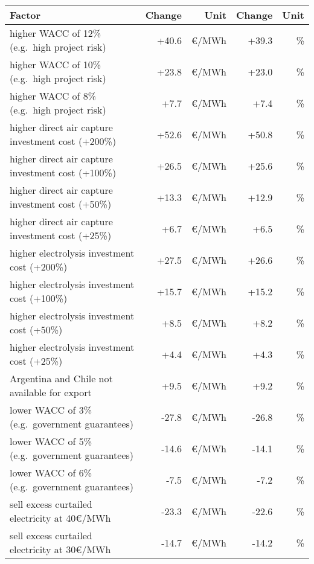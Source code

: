 \begin{table*}
    \small
    \centering
    \begin{tabular}{lrrrr}
        \toprule
        Factor & Change & Unit & Change & Unit\\
        \midrule
        higher WACC of 12\% (e.g.~high project risk) & +40.6 & \euro{}/MWh  & +39.3 & \% \\
        higher WACC of 10\% (e.g.~high project risk) & +23.8 & \euro{}/MWh  & +23.0 & \% \\
        higher WACC of 8\% (e.g.~high project risk) & +7.7 & \euro{}/MWh  & +7.4 & \% \\
        higher direct air capture investment cost (+200\%) & +52.6 & \euro{}/MWh  & +50.8 & \% \\
        higher direct air capture investment cost (+100\%) & +26.5 & \euro{}/MWh  & +25.6 & \% \\
        higher direct air capture investment cost (+50\%) & +13.3 & \euro{}/MWh  & +12.9 & \% \\
        higher direct air capture investment cost (+25\%) & +6.7 & \euro{}/MWh  & +6.5 & \% \\
        higher electrolysis investment cost (+200\%) & +27.5 & \euro{}/MWh  & +26.6 & \% \\
        higher electrolysis investment cost (+100\%) & +15.7 & \euro{}/MWh  & +15.2 & \% \\
        higher electrolysis investment cost (+50\%) & +8.5 & \euro{}/MWh  & +8.2 & \% \\
        higher electrolysis investment cost (+25\%) & +4.4 & \euro{}/MWh  & +4.3 & \% \\
        Argentina and Chile not available for export & +9.5 & \euro{}/MWh  & +9.2 & \% \\
        \midrule
        lower WACC of 3\% (e.g.~government guarantees) & -27.8 & \euro{}/MWh  & -26.8 & \% \\
        lower WACC of 5\% (e.g.~government guarantees) & -14.6 & \euro{}/MWh  & -14.1 & \% \\
        lower WACC of 6\% (e.g.~government guarantees) & -7.5 & \euro{}/MWh  & -7.2 & \% \\
        sell excess curtailed electricity at 40€/MWh & -23.3 & \euro{}/MWh  & -22.6 & \% \\
        sell excess curtailed electricity at 30€/MWh & -14.7 & \euro{}/MWh  & -14.2 & \% \\

\end{tabular}
\end{table*}
